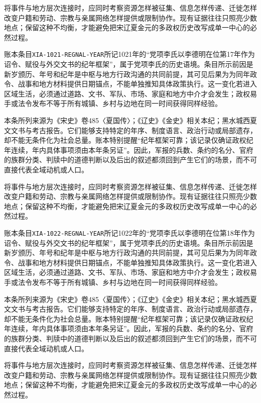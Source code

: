 将事件与地方层次连接时，应同时考察资源怎样被征集、信息怎样传递、迁徙怎样改变户籍和劳动、宗教与亲属网络怎样提供或限制协作。现有证据往往只照亮少数地点；保留这种不均衡，才能避免把宋辽夏金元的多政权历史改写成单一中心的必然过程。

账本条目\texttt{XIA-1021-REGNAL-YEAR}所记1021年的“党项李氏以李德明在位第17年作为诏令、赋役与外交文书的纪年框架”，属于党项李氏的历史语境。条目所示前因是新岁颁历、年号和纪年是中枢与地方行政沟通的共同前提，其可见后果为为同年政令、战事和地方材料提供日期锚点，不能单独推知具体政策执行。这一变化若进入区域生活，必须通过道路、文书、军队、市场、家庭和地方中介才会发生；政权易手或法令发布不等于所有城镇、乡村与边地在同一时间获得同样经验。

本条所列来源为《宋史》卷485〈夏国传〉；《辽史》《金史》相关本纪；黑水城西夏文文书与考古报告。它们能够支持特定的年序、制度语言、政治行动或局部遗存，却不能无条件化为社会总量。账本特别提醒“纪年框架可靠；该记录仅确证政权纪年连续，年内具体事项须由本年条另证”。因此，军报的兵数、条约的名分、官府的族群分类、判牍中的道德判断以及后出的叙述都须回到产生它们的场景，而不可直接代表全域动机或人口。

将事件与地方层次连接时，应同时考察资源怎样被征集、信息怎样传递、迁徙怎样改变户籍和劳动、宗教与亲属网络怎样提供或限制协作。现有证据往往只照亮少数地点；保留这种不均衡，才能避免把宋辽夏金元的多政权历史改写成单一中心的必然过程。

账本条目\texttt{XIA-1022-REGNAL-YEAR}所记1022年的“党项李氏以李德明在位第18年作为诏令、赋役与外交文书的纪年框架”，属于党项李氏的历史语境。条目所示前因是新岁颁历、年号和纪年是中枢与地方行政沟通的共同前提，其可见后果为为同年政令、战事和地方材料提供日期锚点，不能单独推知具体政策执行。这一变化若进入区域生活，必须通过道路、文书、军队、市场、家庭和地方中介才会发生；政权易手或法令发布不等于所有城镇、乡村与边地在同一时间获得同样经验。

本条所列来源为《宋史》卷485〈夏国传〉；《辽史》《金史》相关本纪；黑水城西夏文文书与考古报告。它们能够支持特定的年序、制度语言、政治行动或局部遗存，却不能无条件化为社会总量。账本特别提醒“纪年框架可靠；该记录仅确证政权纪年连续，年内具体事项须由本年条另证”。因此，军报的兵数、条约的名分、官府的族群分类、判牍中的道德判断以及后出的叙述都须回到产生它们的场景，而不可直接代表全域动机或人口。

将事件与地方层次连接时，应同时考察资源怎样被征集、信息怎样传递、迁徙怎样改变户籍和劳动、宗教与亲属网络怎样提供或限制协作。现有证据往往只照亮少数地点；保留这种不均衡，才能避免把宋辽夏金元的多政权历史改写成单一中心的必然过程。
